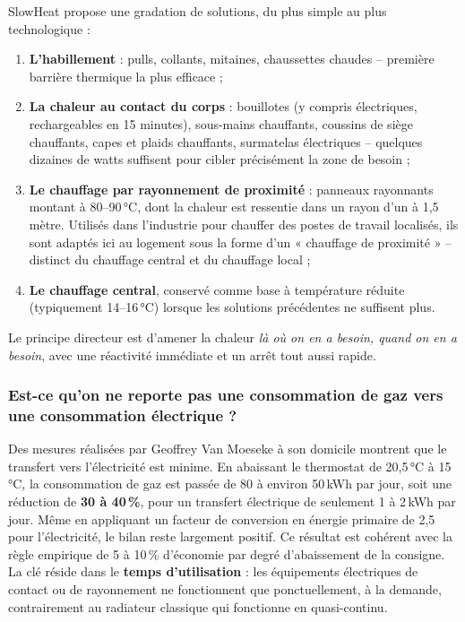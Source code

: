 SlowHeat propose une gradation de solutions, du plus simple au plus technologique :

\begin{enumerate}
    \item \textbf{L'habillement} : pulls, collants, mitaines, chaussettes chaudes -- première barrière thermique la plus efficace ;
    \item \textbf{La chaleur au contact du corps} : bouillotes (y compris électriques, rechargeables en 15 minutes), sous-mains chauffants, coussins de siège chauffants, capes et plaids chauffants, surmatelas électriques -- quelques dizaines de watts suffisent pour cibler précisément la zone de besoin ;
    \item \textbf{Le chauffage par rayonnement de proximité} : panneaux rayonnants montant à 80--90\,°C, dont la chaleur est ressentie dans un rayon d'un à 1,5 mètre. Utilisés dans l'industrie pour chauffer des postes de travail localisés, ils sont adaptés ici au logement sous la forme d'un « chauffage de proximité » -- distinct du chauffage central et du chauffage local ;
    \item \textbf{Le chauffage central}, conservé comme base à température réduite (typiquement 14--16\,°C) lorsque les solutions précédentes ne suffisent plus.
\end{enumerate}

Le principe directeur est d'amener la chaleur \textit{là où on en a besoin, quand on en a besoin}, avec une réactivité immédiate et un arrêt tout aussi rapide.

\subsubsection{Est-ce qu'on ne reporte pas une consommation de gaz vers une consommation électrique ?}

Des mesures réalisées par Geoffrey Van Moeseke à son domicile montrent que le transfert vers l'électricité est minime. En abaissant le thermostat de 20,5\,°C à 15\,°C, la consommation de gaz est passée de 80 à environ 50\,kWh par jour, soit une réduction de \textbf{30 à 40\,\%}, pour un transfert électrique de seulement 1 à 2\,kWh par jour. Même en appliquant un facteur de conversion en énergie primaire de 2,5 pour l'électricité, le bilan reste largement positif. Ce résultat est cohérent avec la règle empirique de 5 à 10\,\% d'économie par degré d'abaissement de la consigne. La clé réside dans le \textbf{temps d'utilisation} : les équipements électriques de contact ou de rayonnement ne fonctionnent que ponctuellement, à la demande, contrairement au radiateur classique qui fonctionne en quasi-continu.

